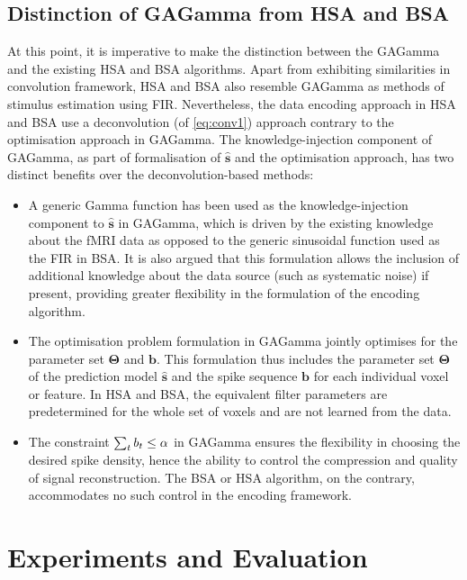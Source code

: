\subsection{Distinction of GAGamma from HSA and BSA}

At this point, it is imperative to make the distinction between the GAGamma and the existing HSA and BSA algorithms. Apart from exhibiting similarities in convolution framework, HSA and BSA also resemble GAGamma as methods of stimulus estimation using FIR. Nevertheless, the data encoding approach in HSA and BSA use a deconvolution (of \equationname \ref{eq:conv1}) approach contrary to the optimisation approach in GAGamma. The knowledge-injection component of GAGamma, as part of formalisation of $\mathbf{\hat{s}}$ and the optimisation approach, has two distinct benefits over the deconvolution-based methods: 
\begin{itemize}
	\item A generic Gamma function has been used as the knowledge-injection component to $\mathbf{\hat{s}}$ in GAGamma, which is driven by the existing knowledge about the fMRI data as opposed to the generic sinusoidal function used as the FIR in BSA. It is also argued that this formulation allows the inclusion of additional knowledge about the data source (such as systematic noise) if present, providing greater flexibility in the formulation of the encoding algorithm.
	
	\item The optimisation problem formulation in GAGamma jointly optimises for the parameter set $\mathbf{\Theta}$ and $\mathbf{b}$. This formulation thus includes the parameter set $\mathbf{\Theta}$ of the prediction model $\mathbf{\hat{s}}$ and the spike sequence $\mathbf{b}$ for each individual voxel or feature. In HSA and BSA, the equivalent filter parameters are predetermined for the whole set of voxels and are not learned from the data.
	
	\item The constraint $\everymath{\displaystyle} \sum_t b_t\leq \alpha$ in GAGamma ensures the flexibility in choosing the desired spike density, hence the ability to control the compression and quality of signal reconstruction. The BSA or HSA algorithm, on the contrary, accommodates no such control in the encoding framework.        
\end{itemize}

\section{Experiments and Evaluation}
